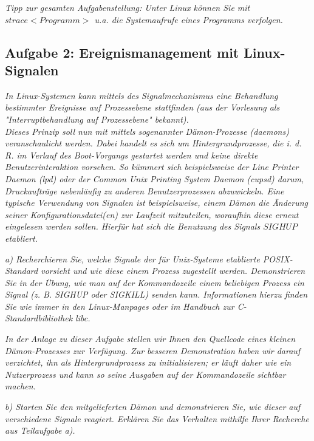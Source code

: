 \documentclass[a4paper]{article}
\begin{document}
\textit{Tipp zur gesamten Aufgabenstellung: Unter Linux können Sie mit $strace <Programm>$ u.a. die Systemaufrufe eines Programms verfolgen.}
\vspace{10mm}


\subsection{Aufgabe 2: Ereignismanagement mit Linux-Signalen}
\textit{In Linux-Systemen kann mittels des Signalmechanismus eine Behandlung bestimmter Ereignisse auf Prozessebene stattfinden (aus der Vorlesung als "Interruptbehandlung auf Prozessebene" bekannt).\\
    Dieses Prinzip soll nun mit mittels sogenannter Dämon-Prozesse (daemons) veranschaulicht werden. Dabei handelt es sich um Hintergrundprozesse, die i. d. R. im Verlauf des Boot-Vorgangs gestartet werden und keine direkte Benutzerinteraktion vorsehen.
    So kümmert sich beispielsweise der Line Printer Daemon (lpd) oder der Common Unix Printing System Daemon (cupsd) darum, Druckaufträge nebenläufig zu anderen Benutzerprozessen abzuwickeln.
    Eine typische Verwendung von Signalen ist beispielsweise, einem Dämon die Änderung seiner Konfigurationsdatei(en) zur Laufzeit mitzuteilen, woraufhin diese erneut eingelesen werden sollen.
    Hierfür hat sich die Benutzung des Signals $SIGHUP$ etabliert.
}
\vspace{10mm}

\textit{a) Recherchieren Sie, welche Signale der für Unix-Systeme etablierte POSIX-Standard vorsieht und wie diese einem Prozess zugestellt werden. Demonstrieren Sie in der Übung, wie man auf der Kommandozeile einem beliebigen Prozess ein Signal (z. B. SIGHUP oder SIGKILL) senden kann.
    Informationen hierzu finden Sie wie immer in den Linux-Manpages oder im Handbuch zur C-Standardbibliothek libc.}
\vspace{10mm}

\textit{In der Anlage zu dieser Aufgabe stellen wir Ihnen den Quellcode eines kleinen Dämon-Prozesses zur Verfügung. Zur besseren Demonstration haben wir darauf verzichtet, ihn als Hintergrundprozess zu initialisieren; er läuft daher wie ein Nutzerprozess und kann so seine Ausgaben auf der Kommandozeile sichtbar machen.}
\vspace{10mm}

\textit{b) Starten Sie den mitgelieferten Dämon und demonstrieren Sie, wie dieser auf verschiedene Signale reagiert. Erklären Sie das Verhalten mithilfe Ihrer Recherche aus Teilaufgabe a).}
\vspace{10mm}
\end{document}
